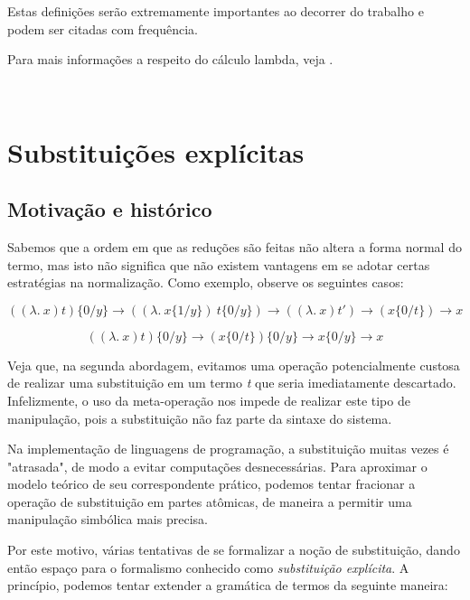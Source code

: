 Estas definições serão extremamente importantes ao decorrer do trabalho e podem
ser citadas com frequência.

Para mais informações a respeito do cálculo lambda, veja \cite{barendregt}.

\



\section{Substituições explícitas}

\subsection{Motivação e histórico}

Sabemos que a ordem em que as reduções são feitas não altera a forma normal do
termo, mas isto não significa que não existem vantagens em se adotar certas
estratégias na normalização. Como exemplo, observe os seguintes casos:

\[ ((\lambda.\ x) t) \{0/y\} \rightarrow ((\lambda.\ x\{1/y\})\ t\{0/y\}) 
    \rightarrow ((\lambda.\ x) t') \rightarrow (x\{0/t\}) \rightarrow x
\]

\[ ((\lambda.\ x) t) \{0/y\} \rightarrow (x\{0/t\}) \{0/y\} 
    \rightarrow x \{0/y\} \rightarrow x \]

Veja que, na segunda abordagem, evitamos uma operação potencialmente custosa de
realizar uma substituição em um termo \emph{t} que seria imediatamente
descartado. Infelizmente, o uso da meta-operação nos impede de realizar este
tipo de manipulação, pois a substituição não faz parte da sintaxe do sistema.

Na implementação de linguagens de programação, a substituição muitas vezes é
"atrasada", de modo a evitar computações desnecessárias. Para aproximar o modelo
teórico de seu correspondente prático, podemos tentar fracionar a operação de
substituição em partes atômicas, de maneira a permitir uma manipulação simbólica
mais precisa. 

Por este motivo, várias tentativas de se formalizar a noção de substituição,
dando então espaço para o formalismo conhecido como \textit{substituição
explícita}. A princípio, podemos tentar extender a gramática de termos da
seguinte maneira:

